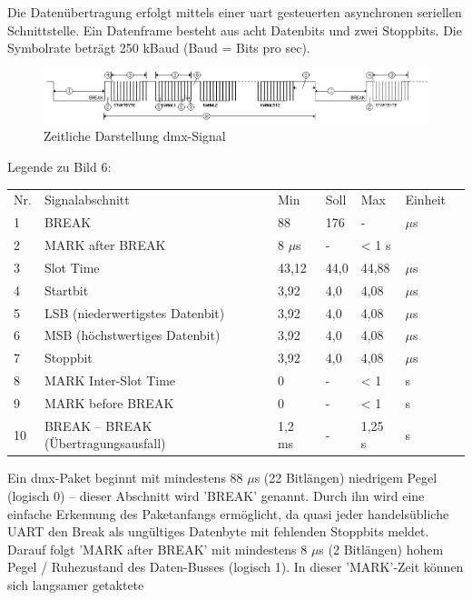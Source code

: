 \documentclass[11pt]{scrartcl}
\begin{document}
Die Datenübertragung erfolgt mittels einer \ac{uart} gesteuerten asynchronen seriellen Schnittstelle. Ein
Datenframe besteht aus acht Datenbits und zwei Stoppbits. Die Symbolrate beträgt 250 kBaud (Baud = Bits pro sec).
\begin{figure}[H]
    \includegraphics[width=\textwidth]{images/DMX_zeitlich.png}
    \caption{Zeitliche Darstellung \ac{dmx}-Signal}
\end{figure}
\noindent
\begin{table}[H]
    \small
    Legende zu Bild 6:\\
    \begin{tabular*}{\textwidth}{l @{\extracolsep{\fill}} llllll}
        Nr. & Signalabschnitt & Min & Soll & Max & Einheit\\
        1 & BREAK & 88 & 176 & - & $\mu$s\\
        2 & MARK after BREAK & 8 $\mu$s & - & < 1 s\\
        3 & Slot Time & 43,12 & 44,0 & 44,88 & $\mu$s\\
        4 & Startbit & 3,92 & 4,0 & 4,08 & $\mu$s\\
        5 & LSB (niederwertigstes Datenbit) & 3,92 & 4,0 & 4,08 & $\mu$s\\
        6 & MSB (höchstwertiges Datenbit) & 3,92 & 4,0 & 4,08 & $\mu$s\\
        7 & Stoppbit & 3,92 & 4,0 & 4,08 & $\mu$s\\
        8 & MARK Inter-Slot Time & 0 & - & < 1 & s\\
        9 & MARK before BREAK & 0 & - & < 1 & s\\
        10 & BREAK – BREAK (Übertragungsausfall) & 1,2 ms & - & 1,25 s & s\\
    \end{tabular*}
\end{table}
\noindent
Ein \ac{dmx}-Paket beginnt mit mindestens 88 $\mu$s (22 Bitlängen) niedrigem Pegel (logisch 0) – dieser
Abschnitt wird 'BREAK' genannt. Durch ihn wird eine einfache Erkennung des Paketanfangs
ermöglicht, da quasi jeder handelsübliche UART den Break als ungültiges Datenbyte mit fehlenden
Stoppbits meldet. Darauf folgt 'MARK after BREAK' mit mindestens 8 $\mu$s (2 Bitlängen) hohem Pegel /
Ruhezustand des Daten-Busses (logisch 1). In dieser 'MARK'-Zeit können sich langsamer getaktete
\end{document}

